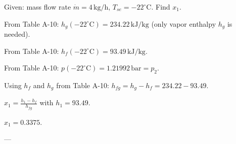 Given: mass flow rate \( \dot{m} = 4 \, \text{kg/h} \), \( T_{se} = -22^\circ \text{C} \).  
Find \( x_1 \).  

From Table A-10:  
\( h_g(-22^\circ \text{C}) = 234.22 \, \text{kJ/kg} \)  
(only vapor enthalpy \( h_g \) is needed).  

From Table A-10:  
\( h_f(-22^\circ \text{C}) = 93.49 \, \text{kJ/kg} \).  

From Table A-10:  
\( p(-22^\circ \text{C}) = 1.21992 \, \text{bar} = p_2 \).  

Using \( h_f \) and \( h_g \) from Table A-10:  
\( h_{fg} = h_g - h_f = 234.22 - 93.49 \).  

\( x_1 = \frac{h_1 - h_f}{h_{fg}} \) with \( h_1 = 93.49 \).  

\( x_1 = 0.3375 \).  

---